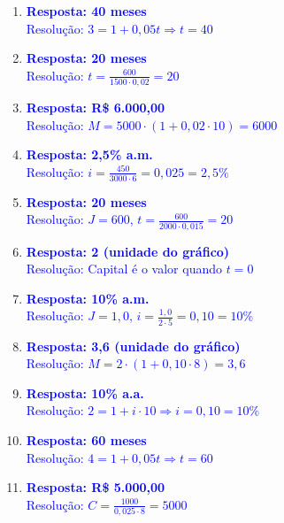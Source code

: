 \documentclass[11pt]{article}
\begin{document}
\begin{multicols}{2}
\begin{enumerate}[leftmargin=*, itemsep=2pt]
\item \textcolor{blue}{\textbf{Resposta: 40 meses}} \\
\textcolor{blue}{Resolução: $3 = 1 + 0,05t \Rightarrow t = 40$}

\item \textcolor{blue}{\textbf{Resposta: 20 meses}} \\
\textcolor{blue}{Resolução: $t = \frac{600}{1500 \cdot 0,02} = 20$}

\item \textcolor{blue}{\textbf{Resposta: R\$ 6.000,00}} \\
\textcolor{blue}{Resolução: $M = 5000 \cdot (1 + 0,02 \cdot 10) = 6000$}

\item \textcolor{blue}{\textbf{Resposta: 2,5\% a.m.}} \\
\textcolor{blue}{Resolução: $i = \frac{450}{3000 \cdot 6} = 0,025 = 2,5\%$}

\item \textcolor{blue}{\textbf{Resposta: 20 meses}} \\
\textcolor{blue}{Resolução: $J = 600$, $t = \frac{600}{2000 \cdot 0,015} = 20$}

\item \textcolor{blue}{\textbf{Resposta: 2 (unidade do gráfico)}} \\
\textcolor{blue}{Resolução: Capital é o valor quando $t = 0$}

\item \textcolor{blue}{\textbf{Resposta: 10\% a.m.}} \\
\textcolor{blue}{Resolução: $J = 1,0$, $i = \frac{1,0}{2 \cdot 5} = 0,10 = 10\%$}

\item \textcolor{blue}{\textbf{Resposta: 3,6 (unidade do gráfico)}} \\
\textcolor{blue}{Resolução: $M = 2 \cdot (1 + 0,10 \cdot 8) = 3,6$}

\item \textcolor{blue}{\textbf{Resposta: 10\% a.a.}} \\
\textcolor{blue}{Resolução: $2 = 1 + i \cdot 10 \Rightarrow i = 0,10 = 10\%$}

\item \textcolor{blue}{\textbf{Resposta: 60 meses}} \\
\textcolor{blue}{Resolução: $4 = 1 + 0,05t \Rightarrow t = 60$}

\item \textcolor{blue}{\textbf{Resposta: R\$ 5.000,00}} \\
\textcolor{blue}{Resolução: $C = \frac{1000}{0,025 \cdot 8} = 5000$}


\end{enumerate}
\end{multicols}
\end{document}
